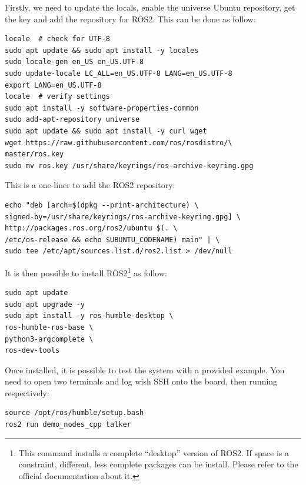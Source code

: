 \documentclass[10pt]{article}
\begin{document}
Firstly, we need to update the locals,  enable the universe Ubuntu repository, get the key and add the repository for ROS2. This can be done as follow:

\begin{tcolorbox}
\begin{verbatim}
locale  # check for UTF-8
sudo apt update && sudo apt install -y locales
sudo locale-gen en_US en_US.UTF-8
sudo update-locale LC_ALL=en_US.UTF-8 LANG=en_US.UTF-8
export LANG=en_US.UTF-8
locale  # verify settings
sudo apt install -y software-properties-common
sudo add-apt-repository universe
sudo apt update && sudo apt install -y curl wget
wget https://raw.githubusercontent.com/ros/rosdistro/\
master/ros.key
sudo mv ros.key /usr/share/keyrings/ros-archive-keyring.gpg
\end{verbatim}
\end{tcolorbox}


This is a one-liner to add the ROS2 repository:

\begin{tcolorbox}
\begin{verbatim}
echo "deb [arch=$(dpkg --print-architecture) \
signed-by=/usr/share/keyrings/ros-archive-keyring.gpg] \
http://packages.ros.org/ros2/ubuntu $(. \
/etc/os-release && echo $UBUNTU_CODENAME) main" | \
sudo tee /etc/apt/sources.list.d/ros2.list > /dev/null
\end{verbatim}
\end{tcolorbox}

It is then possible to install ROS2\footnote{This command installs a complete ``desktop'' version of ROS2. If space is a constraint, different, less complete packages can be install. Please refer to the official documentation about it.} as follow:

\begin{tcolorbox}
\begin{verbatim}
sudo apt update
sudo apt upgrade -y
sudo apt install -y ros-humble-desktop \
ros-humble-ros-base \
python3-argcomplete \
ros-dev-tools
\end{verbatim}
\end{tcolorbox}

Once installed, it is possible to test the system with a provided example. You need to open two terminals and log wish SSH onto the board, then running respectively:

\begin{tcolorbox}
\begin{verbatim}
source /opt/ros/humble/setup.bash
ros2 run demo_nodes_cpp talker
\end{verbatim}
\end{tcolorbox}
\end{document}
